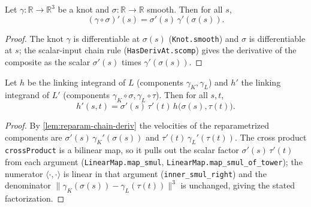\begin{lemma}
    \label{lem:reparam-chain-deriv}
    \leanok
    Let $\gamma:\mathbb{R}\to\mathbb{R}^3$ be a knot and $\sigma:\mathbb{R}\to
    \mathbb{R}$ smooth. Then for all $s$,
    \[
        (\gamma\circ\sigma)'(s) = \sigma'(s)\,\gamma'(\sigma(s)).
    \]
\end{lemma}
\begin{proof}
    The knot $\gamma$ is differentiable at $\sigma(s)$ (\texttt{Knot.smooth}) and
    $\sigma$ is differentiable at $s$; the scalar-input chain rule
    (\texttt{HasDerivAt.scomp}) gives the derivative of the composite as the scalar
    $\sigma'(s)$ times $\gamma'(\sigma(s))$.
\end{proof}

\begin{lemma}
    \label{lem:reparam-integrand-scaling}
    Let $h$ be the linking integrand of $L$ (components $\gamma_K,\gamma_L$) and $h'$
    the linking integrand of $L'$ (components $\gamma_K\circ\sigma,\gamma_L\circ\tau$).
    Then for all $s,t$,
    \[
        h'(s,t) = \sigma'(s)\,\tau'(t)\,h\bigl(\sigma(s),\tau(t)\bigr).
    \]
\end{lemma}
\begin{proof}
    By \cref{lem:reparam-chain-deriv} the velocities of the reparametrized components
    are $\sigma'(s)\,\gamma_K'(\sigma(s))$ and $\tau'(t)\,\gamma_L'(\tau(t))$. The
    cross product \texttt{crossProduct} is a bilinear map, so it pulls out the scalar
    factor $\sigma'(s)\,\tau'(t)$ from each argument (\texttt{LinearMap.map\_smul},
    \texttt{LinearMap.map\_smul\_of\_tower}); the numerator $\langle\cdot,\cdot\rangle$
    is linear in that argument (\texttt{inner\_smul\_right}) and the denominator
    $\lVert\gamma_K(\sigma(s))-\gamma_L(\tau(t))\rVert^{3}$ is unchanged, giving the
    stated factorization.
\end{proof}


